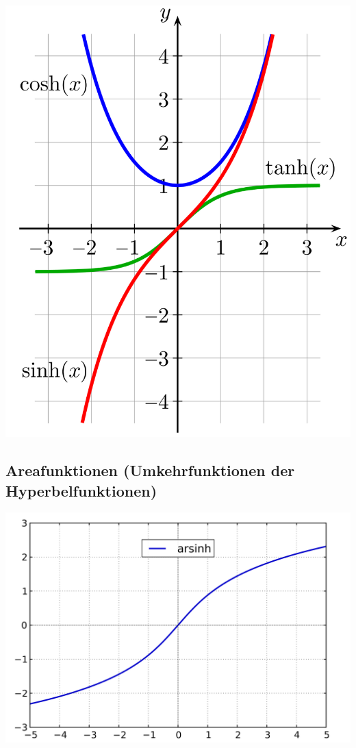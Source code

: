 \begin{multicols*}{3}
    \begin{center}
        \includegraphics[width=1\linewidth]{Bilder/Sinh_cosh_tanh.png}
    \end{center}
    \vfill\null
    \columnbreak

    \subsection{Areafunktionen (Umkehrfunktionen der Hyperbelfunktionen)}

    \begin{center}
        \includegraphics[width=0.95\linewidth]{Bilder/arsinh.png}
    \end{center}


\end{multicols*}
